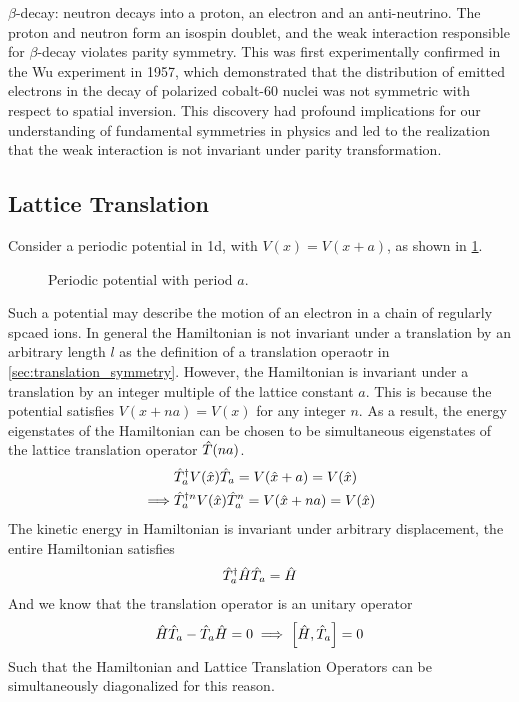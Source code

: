 $\beta$-decay: neutron decays into a proton, an electron and an anti-neutrino. The proton and neutron form an isospin doublet, and the weak interaction responsible for $\beta$-decay violates parity symmetry. This was first experimentally confirmed in the Wu experiment in 1957, which demonstrated that the distribution of emitted electrons in the decay of polarized cobalt-60 nuclei was not symmetric with respect to spatial inversion. This discovery had profound implications for our understanding of fundamental symmetries in physics and led to the realization that the weak interaction is not invariant under parity transformation. 

\newpage
\subsection{Lattice Translation}

Consider a periodic potential in 1d, with $V(x) = V(x+a)$, as shown in \cref{fig:periodic_lattics}.

\begin{figure}[h!]
    \centering
    \caption{Periodic potential with period $a$.}
    \label{fig:periodic_lattics}
\end{figure}

Such a potential may describe the motion of an electron in a chain of regularly spcaed ions. In general the Hamiltonian is not invariant under a translation by an arbitrary length $l$ as the definition of a translation operaotr in \cref{sec:translation_symmetry}. However, the Hamiltonian is invariant under a translation by an integer multiple of the lattice constant $a$.
This is because the potential satisfies $V(x+na) = V(x)$ for any integer $n$. As a result, the energy eigenstates of the Hamiltonian can be chosen to be simultaneous eigenstates of the lattice translation operator $\hat{T}(na)$. 
\begin{align}
    &\hat{T}_a^ \dag V(\hat{x}) \hat{T}_a = V (\hat{x}+a) = V(\hat{x})  \\
    \implies & {\hat{T}_a^ {\dag n}} V(\hat{x}) {\hat{T}_a}^n = V(\hat{x} +na) = V(\hat{x})
\end{align}
The kinetic energy in Hamiltonian is invariant under arbitrary displacement, the entire Hamiltonian satisfies
\begin{align}
    \hat{T}_a^ \dag \hat{H} \hat{T}_a = \hat{H} 
\end{align}
And we know that the translation operator is an unitary operator 
\begin{align}
    \hat{H} \hat{T}_a - \hat{T}_a \hat{H} = 0 \implies \left[ \hat{H} , \hat{T}_a \right] = 0
\end{align}
Such that the Hamiltonian and Lattice Translation Operators can be simultaneously diagonalized for this reason. 

